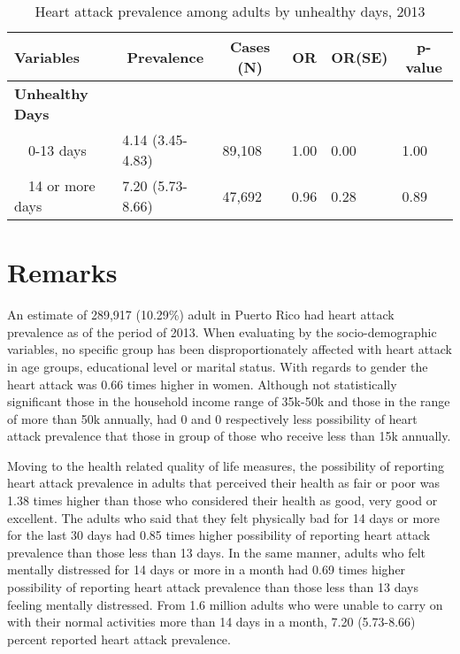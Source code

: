 \begin{table}[H]
\caption{Heart attack prevalence among adults by unhealthy days, 2013\label{tab:unhlthy.Heart_Attack.2013}} 
\begin{center}
\begin{tabular}{llllll}
\hline\hline
\multicolumn{1}{l}{Variables}&\multicolumn{1}{c}{Prevalence}&\multicolumn{1}{c}{Cases (N)}&\multicolumn{1}{c}{OR}&\multicolumn{1}{c}{OR(SE)}&\multicolumn{1}{c}{p-value}\tabularnewline
\hline
{\bfseries Unhealthy Days}&&&&&\tabularnewline
~~0-13 days&4.14 (3.45-4.83)&89,108&1.00&0.00&1.00\tabularnewline
~~14 or more days&7.20 (5.73-8.66)&47,692&0.96&0.28&0.89\tabularnewline
\hline
\end{tabular}\end{center}

\end{table}


 \section{Remarks}

An estimate of 289,917 
(10.29\%) adult in Puerto Rico had heart attack prevalence as of the period of 2013.
When evaluating by the socio-demographic variables, no specific group has been disproportionately affected with heart attack in age groups, educational level or marital status. With regards to gender the heart attack was 0.66 times higher in women. Although not statistically significant those in the household income range of 35k-50k and those in the range of more than 50k annually, had 0 and 0 respectively less possibility of heart attack prevalence that those  in group of those who receive less than 15k annually.

Moving to the health related quality of life measures, the possibility of reporting heart attack prevalence in adults that perceived their health as fair or poor was 1.38 times higher than those who considered their health as good, very good or excellent. The adults who said that they felt physically bad for 14 days or more for the last 30 days had 0.85 times higher possibility of reporting heart attack prevalence than those less than 13 days. In the same manner, adults who felt mentally distressed for 14 days or more in a month had 0.69 times higher possibility of reporting heart attack prevalence than those less than 13 days feeling mentally distressed. From 1.6 million adults who were unable to carry on with their normal activities more than 14 days in a month, 7.20 (5.73-8.66) percent reported heart attack prevalence. 

